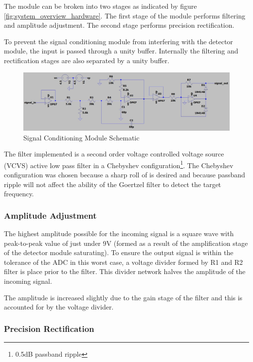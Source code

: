The module can be broken into two stages as indicated by figure \ref{fig:system_overview_hardware}. The first stage of the module performs filtering and amplitude adjustment. The second stage performs precision rectification.

To prevent the signal conditioning module from interfering with the detector module, the input is passed through a unity buffer. Internally the filtering and rectification stages are also separated by a unity buffer.

\begin{figure}[H]
	\centering
	\includegraphics[width=\textwidth]{figures/design/filter_and_rectify}
	\caption{Signal Conditioning Module Schematic}
	\label{fig:schematic_filter_and_rectify}
\end{figure}

The filter implemented is a second order voltage controlled voltage source (VCVS) active low pass filter in a Chebyshev configuration\footnote{0.5dB passband ripple}. The Chebyshev configuration was chosen because a sharp roll of is desired and because passband ripple will not affect the ability of the Goertzel filter to detect the target frequency.


\subsubsection{Amplitude Adjustment}
The highest amplitude possible for the incoming signal is a square wave with peak-to-peak value of just under 9V (formed as a result of the amplification stage of the detector module saturating). To ensure the output signal is within the tolerance of the ADC in this worst case, a voltage divider formed by R1 and R2 filter is place prior to the filter. This divider network halves the amplitude of the incoming signal.

The amplitude is increased slightly due to the gain stage of the filter and this is accounted for by the voltage divider.

\subsubsection{Precision Rectification}

